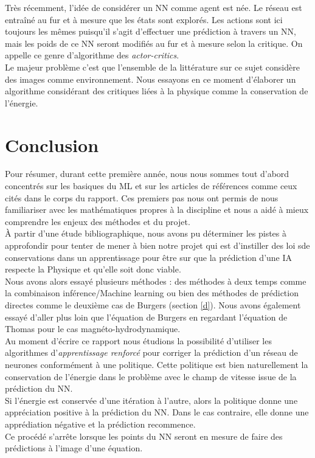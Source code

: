\documentclass[a4paper,12pt]{article}
\newcommand\bk{\color{black}}
\newcommand\navy{\color{navy}}
\numberwithin{equation}{section} %
\begin{document}
\noindent Très récemment, l'idée de considérer un NN comme agent est née. Le réseau est entraîné au fur et à mesure que les états sont explorés. Les actions sont ici toujours les mêmes puisqu'il s'agit d'effectuer une prédiction à travers un NN, mais les poids de ce NN seront modifiés au fur et à mesure selon la critique. On appelle ce genre d'algorithme des \textit{actor-critics}.\\

\noindent Le majeur problème c'est que l'ensemble de la littérature sur ce sujet considère des images comme environnement. Nous essayons en ce moment d'élaborer un algorithme considérant des critiques liées à la physique comme la conservation de l'énergie.

\pagebreak

\navy \section{Conclusion} \bk
\noindent Pour résumer, durant cette première année, nous nous sommes tout d'abord concentrés sur les basiques du ML et sur les articles de références comme ceux cités dans le corps du rapport. Ces premiers pas nous ont permis de nous familiariser avec les mathématiques propres à la discipline et nous a aidé à mieux comprendre les enjeux des méthodes et du projet.\\
À partir d'une étude bibliographique, nous avons pu déterminer les pistes à approfondir pour tenter de mener à bien notre projet qui est d'instiller des loi sde conservations dans un apprentissage pour être sur que la prédiction d'une IA respecte la Physique et qu'elle soit donc viable.\\
Nous avons alors essayé plusieurs méthodes : des méthodes à deux temps comme la combinaison inférence/Machine learning ou bien des méthodes de prédiction directes comme le deuxième cas de Burgers (section \eqref{d}). Nous avons également essayé d'aller plus loin que l'équation de Burgers en regardant l'équation de Thomas pour le cas magnéto-hydrodynamique.\\
	
\noindent Au moment d'écrire ce rapport nous étudions la possibilité d'utiliser les algorithmes d'\textit{apprentissage renforcé} pour corriger la prédiction d'un réseau de neurones conformément à une politique. Cette politique est bien naturellement la conservation de l'énergie dans le problème avec le champ de vitesse issue de la prédiction du NN. \\
Si l'énergie est conservée d'une itération à l'autre, alors la politique donne une appréciation positive à la prédiction du NN. Dans le cas contraire, elle donne une apprédiation négative et la prédiction recommence.\\
Ce procédé s'arrête lorsque les points du NN seront en mesure de faire des prédictions à l'image d'une équation.\\




\pagebreak



\end{document}
